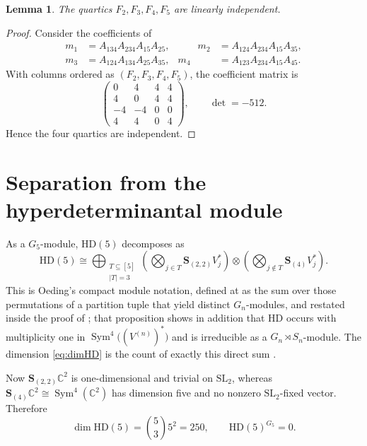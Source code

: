 \documentclass[11pt]{amsart}
\newtheorem{lemma}[theorem]{Lemma}
\theoremstyle{remark}
\newcommand{\C}{\mathbb C}
\newcommand{\HD}{\mathrm{HD}}
\newcommand{\Sym}{\operatorname{Sym}}
\newcommand{\bS}{\mathbf S}
\begin{document}
\begin{lemma}\label{lem:independence}
The quartics \(F_2,F_3,F_4,F_5\) are linearly independent.
\end{lemma}

\begin{proof}
Consider the coefficients of
\[
\begin{aligned}
 m_1&=A_{134}A_{234}A_{15}A_{25},
&\qquad
 m_2&=A_{124}A_{234}A_{15}A_{35},\\
 m_3&=A_{124}A_{134}A_{25}A_{35},
&
 m_4&=A_{123}A_{234}A_{15}A_{45}.
\end{aligned}
\]
With columns ordered as \((F_2,F_3,F_4,F_5)\), the coefficient matrix is
\[
  \begin{pmatrix}
   0& 4& 4& 4\\
   4& 0& 4& 4\\
  -4&-4& 0& 0\\
   4& 4& 0& 4
  \end{pmatrix},
  \qquad
  \det=-512.
\]
Hence the four quartics are independent.
\end{proof}

\section{Separation from the hyperdeterminantal module}\label{sec:separation}

As a \(G_5\)-module, \(\HD(5)\) decomposes as
\begin{equation}\label{eq:HDdecomp}
 \HD(5)
 \cong
 \bigoplus_{\substack{T\subseteq[5]\\ |T|=3}}
 \left(
   \bigotimes_{j\in T}\bS_{(2,2)}V_j^*
 \right)
 \otimes
 \left(
   \bigotimes_{j\notin T}\bS_{(4)}V_j^*
 \right).
\end{equation}
This is Oeding's compact module notation, defined at \cite[p.~85]{Oeding}
as the sum over those permutations of a partition tuple that yield distinct
\(G_n\)-modules, and restated inside the proof of
\cite[Proposition~5.2]{Oeding}; that proposition shows in addition that
\(\HD\) occurs with multiplicity one in \(\Sym^4\bigl((V^{(n)})^*\bigr)\)
and is irreducible as a \(G_n\rtimes S_n\)-module. The dimension
\eqref{eq:dimHD} is the count of exactly this direct sum
\cite[Observation~5.1]{Oeding}.

Now \(\bS_{(2,2)}\C^2\) is one-dimensional and trivial on
\(\mathrm{SL}_2\), whereas
\(\bS_{(4)}\C^2\cong\Sym^4(\C^2)\) has dimension five and no nonzero
\(\mathrm{SL}_2\)-fixed vector. Therefore
\begin{equation}\label{eq:HDfacts}
  \dim\HD(5)=\binom53 5^2=250,
  \qquad
  \HD(5)^{G_5}=0.
\end{equation}
\end{document}
